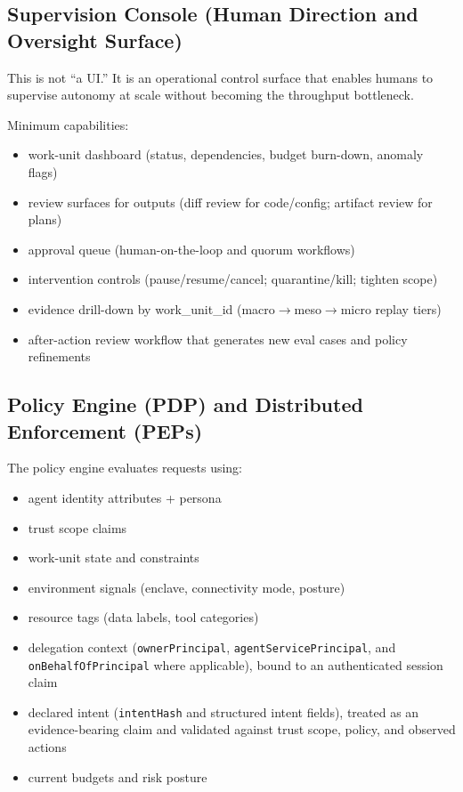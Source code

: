 \documentclass[11pt]{article}
\begin{document}
\hypertarget{supervision-console-human-direction-and-oversight-surface}{%
\subsection{Supervision Console (Human Direction and Oversight Surface)}\label{supervision-console-human-direction-and-oversight-surface}}

This is not ``a UI.'' It is an operational control surface that enables
humans to supervise autonomy at scale without becoming the throughput
bottleneck.

Minimum capabilities:

\begin{itemize}
\tightlist
\item
  work-unit dashboard (status, dependencies, budget burn-down, anomaly
  flags)
\item
  review surfaces for outputs (diff review for code/config; artifact
  review for plans)
\item
  approval queue (human-on-the-loop and quorum workflows)
\item
  intervention controls (pause/resume/cancel; quarantine/kill; tighten
  scope)
\item
  evidence drill-down by work\_unit\_id (macro\ensuremath{\rightarrow}meso\ensuremath{\rightarrow}micro replay tiers)
\item
  after-action review workflow that generates new eval cases and policy
  refinements
\end{itemize}

\hypertarget{policy-engine-pdp-and-distributed-enforcement-peps}{%
\subsection{Policy Engine (PDP) and Distributed Enforcement (PEPs)}\label{policy-engine-pdp-and-distributed-enforcement-peps}}

The policy engine evaluates requests using:

\begin{itemize}
\tightlist
\item
  agent identity attributes + persona
\item
  trust scope claims
\item
  work-unit state and constraints
\item
  environment signals (enclave, connectivity mode, posture)
\item
  resource tags (data labels, tool categories)
\item
  delegation context (\texttt{ownerPrincipal},
  \texttt{agentServicePrincipal}, and \texttt{onBehalfOfPrincipal} where
  applicable), bound to an authenticated session claim
\item
  declared intent (\texttt{intentHash} and structured intent fields),
  treated as an evidence-bearing claim and validated against trust
  scope, policy, and observed actions
\item
  current budgets and risk posture
\end{itemize}
\end{document}
